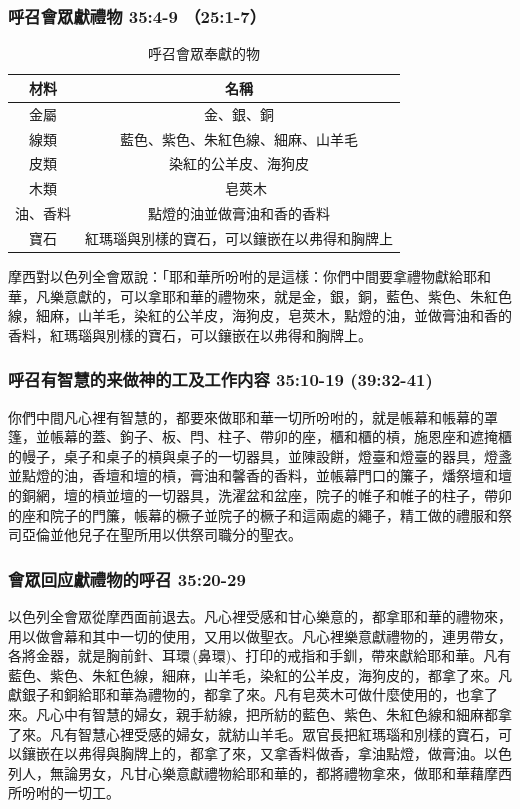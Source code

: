 \begin{table}
\subsubsection{呼召會眾獻禮物 35:4-9 （25:1-7）}
\begin{table}
\vspace*{-1cm}
\begin{tabular}{|c|c| }
\hline
\hline
材料 & 名稱  \\\hline
金屬 & 金、銀、銅    \\\hline
線類&藍色、紫色、朱紅色線、細麻、山羊毛  \\\hline
皮類&染紅的公羊皮、海狗皮 \\\hline
木類&　皂莢木 　\\\hline
油、香料&點燈的油並做膏油和香的香料　\\\hline
寶石&紅瑪瑙與別樣的寶石，可以鑲嵌在以弗得和胸牌上 \\\hline
\end{tabular}
\caption{呼召會眾奉獻的物}
\end{table} 
摩西對以色列全會眾說：「耶和華所吩咐的是這樣：你們中間要拿禮物獻給耶和華，凡樂意獻的，可以拿耶和華的禮物來，就是金，銀，銅，藍色、紫色、朱紅色線，細麻，山羊毛，染紅的公羊皮，海狗皮，皂莢木，點燈的油，並做膏油和香的香料，紅瑪瑙與別樣的寶石，可以鑲嵌在以弗得和胸牌上。

\subsubsection{呼召有智慧的来做神的工及工作内容 35:10-19 (39:32-41)}
你們中間凡心裡有智慧的，都要來做耶和華一切所吩咐的，就是帳幕和帳幕的罩篷，並帳幕的蓋、鉤子、板、閂、柱子、帶卯的座，櫃和櫃的槓，施恩座和遮掩櫃的幔子，桌子和桌子的槓與桌子的一切器具，並陳設餅，燈臺和燈臺的器具，燈盞並點燈的油，香壇和壇的槓，膏油和馨香的香料，並帳幕門口的簾子，燔祭壇和壇的銅網，壇的槓並壇的一切器具，洗濯盆和盆座，院子的帷子和帷子的柱子，帶卯的座和院子的門簾，帳幕的橛子並院子的橛子和這兩處的繩子，精工做的禮服和祭司亞倫並他兒子在聖所用以供祭司職分的聖衣。

\subsubsection{會眾回应獻禮物的呼召 35:20-29}
以色列全會眾從摩西面前退去。凡心裡受感和甘心樂意的，都拿耶和華的禮物來，用以做會幕和其中一切的使用，又用以做聖衣。凡心裡樂意獻禮物的，連男帶女，各將金器，就是胸前針、耳環 (鼻環)、打印的戒指和手釧，帶來獻給耶和華。凡有藍色、紫色、朱紅色線，細麻，山羊毛，染紅的公羊皮，海狗皮的，都拿了來。凡獻銀子和銅給耶和華為禮物的，都拿了來。凡有皂莢木可做什麼使用的，也拿了來。凡心中有智慧的婦女，親手紡線，把所紡的藍色、紫色、朱紅色線和細麻都拿了來。凡有智慧心裡受感的婦女，就紡山羊毛。眾官長把紅瑪瑙和別樣的寶石，可以鑲嵌在以弗得與胸牌上的，都拿了來，又拿香料做香，拿油點燈，做膏油。以色列人，無論男女，凡甘心樂意獻禮物給耶和華的，都將禮物拿來，做耶和華藉摩西所吩咐的一切工。


\end{table}
